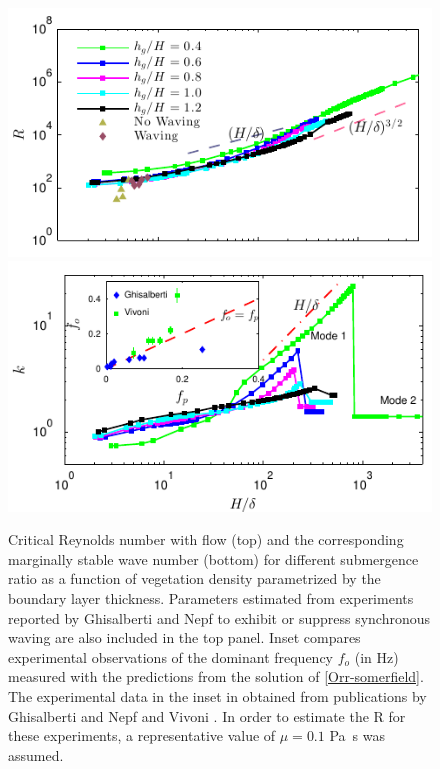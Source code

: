 \documentclass[aps,prl,reprint,twocolumn,showpacs,superscriptaddress,10pt]{revtex4-1}  %
\newcommand{\Rey}{\text{R}}
\begin{document}
\begin{figure}
\begin{center}
\includegraphics[]{Critical_Re_vs_delta_noshear} \\
\vspace{-6mm} \hspace{-3mm}
\includegraphics[]{K_vs_shear_width_noshear}
\end{center}
\caption{Critical Reynolds number with flow (top) and the corresponding marginally stable wave number (bottom) for different submergence ratio as a function of vegetation density
 parametrized by the boundary layer thickness. Parameters estimated from experiments reported by Ghisalberti and Nepf\cite{Ghisal02} to exhibit or suppress synchronous waving are 
also included in the top panel. Inset compares experimental observations 
of the dominant frequency $f_o$ (in Hz) measured with the predictions from the solution of \eqref{Orr-somerfield}. The experimental data in the inset in obtained from publications by 
Ghisalberti and Nepf \cite{Ghisal02} and Vivoni \cite{Vivoni98}. In order to estimate the $\Rey$ for these experiments, a representative value of $\mu=0.1$ Pa~s was assumed.}
\label{Re_vs_delta}
\end{figure}
\end{document}

